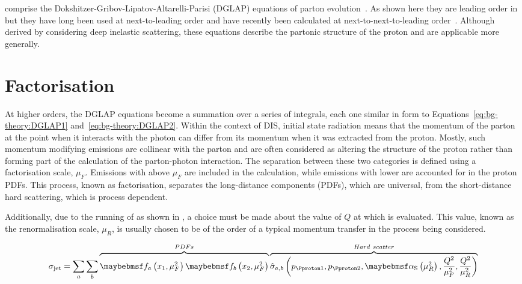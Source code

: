  comprise the Dokshitzer-Gribov-Lipatov-Altarelli-Parisi (DGLAP) equations of parton evolution~\cite{Gribov:1972:DGLAP,Altarelli:1977:DGLAP,Dokshitzer:1977:DGLAP,Collins:1989:DGLAP}.
As shown here they are leading order in \alphaS but they have long been used at next-to-leading order and have recently been calculated at next-to-next-to-leading order~\cite{Moch:2004:threeLoop,Vogt:2004:threeLoop}.
Although derived by considering deep inelastic scattering, these equations describe the partonic structure of the proton and are applicable more generally.

\section{\QCD Factorisation}
\label{sec:bg-theory:qcd_factorisation}
At higher orders, the DGLAP equations become a summation over a series of integrals, each one similar in form to Equations~\ref{eq:bg-theory:DGLAP1} and~\ref{eq:bg-theory:DGLAP2}.
Within the context of DIS, initial state radiation means that the momentum of the parton at the point when it interacts with the photon can differ from its momentum when it was extracted from the proton.
Mostly, such momentum modifying emissions are collinear with the parton and are often considered as altering the structure of the proton rather than forming part of the calculation of the parton-photon interaction.
The separation between these two categories is defined using a factorisation scale, $\mu_F$.
Emissions with \pT above $\mu_F$ are included in the calculation, while emissions with lower \pT are accounted for in the proton PDFs.
This process, known as \QCD factorisation, separates the long-distance components (PDFs), which are universal, from the short-distance hard scattering, which is process dependent.

Additionally, due to the running of \alphaS as shown in , a choice must be made about the value of $Q$ at which \alphaS is evaluated.
This value, known as the renormalisation scale, $\mu_R$, is usually chosen to be of the order of a typical momentum transfer in the process being considered.

\begin{equation}
  \sigma_{\mathrm{jet}} = \sum_a \sum_b \overbrace{ \vphantom{\frac{Q^2}{\mu_R^2}} \PDF{a} \left( x_1, \mu_F^2 \right) \PDF{b} \left( x_2, \mu_F^2 \right) }^{PDFs}
    \overbrace{ \hat{\sigma}_{a,b} \left( p_{\Pproton1}, p_{\Pproton2}, \alphaS \left(\mu_R^2\right), \frac{Q^2}{\mu_F^2}, \frac{Q^2}{\mu_R^2} \right) }^{Hard~scatter}
    \label{eq:bg-theory:QCDfactorisation}
\end{equation}

